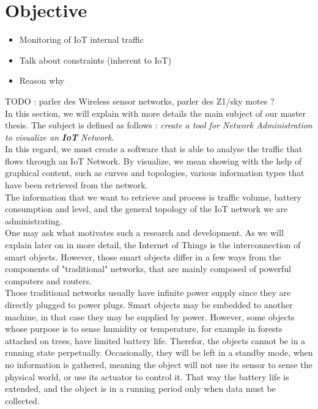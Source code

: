 \section{Objective}

\begin{itemize}
	\item Monitoring of IoT internal traffic
	\item Talk about constraints (inherent to IoT)
	\item Reason why 
\end{itemize}

TODO : parler des Wireless sensor networks, parler des Z1/sky motes ? \\

In this section, we will explain with more details the main subject of our master thesis. The subject is defined as follows : \textit{create a tool for Network Administration to visualize an \textbf{IoT} Network}.\\

In this regard, we must create a software that is able to analyse the traffic that flows through an IoT Network. By visualize, we mean showing with the help of graphical content, such as curves and topologies, various information types that have been retrieved from the network.\\

The information that we want to retrieve and process is traffic volume, battery consumption and level, and the general topology of the IoT network we are administrating.\\

One may ask what motivates such a research and development. As we will explain later on in more detail, the Internet of Things is the interconnection of smart objects. However, those smart objects differ in a few ways from the components of "traditional" networks, that are mainly composed of powerful computers and routers.\\

Those traditional networks usually have infinite power supply since they are directly plugged to power plugs. Smart objects may be embedded to another machine, in that case they may be supplied by power. However, some objects whose purpose is to sense humidity or temperature, for example in forests attached on trees, have limited battery life. Therefor, the objects cannot be in a running state perpetually. Occasionally, they will be left in a standby mode, when no information is gathered, meaning the object will not use its sensor to sense the physical world, or use its actuator to control it. That way the battery life is extended, and the object is in a running period only when data must be collected. \\

